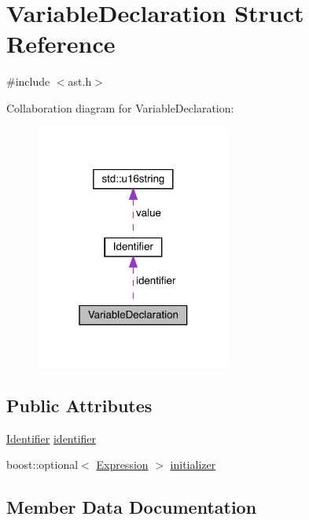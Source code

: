 \hypertarget{struct_variable_declaration}{}\section{Variable\+Declaration Struct Reference}
\label{struct_variable_declaration}


{\ttfamily \#include $<$ast.\+h$>$}



Collaboration diagram for Variable\+Declaration\+:\nopagebreak
\begin{figure}[H]
\begin{center}
\leavevmode
\includegraphics[width=183pt]{struct_variable_declaration__coll__graph}
\end{center}
\end{figure}
\subsection*{Public Attributes}
\begin{DoxyCompactItemize}
\item 
\hyperlink{struct_identifier}{Identifier} \hyperlink{struct_variable_declaration_ac2becfe85c6ae641ab60e8489fde7e38}{identifier}
\item 
boost\+::optional$<$ \hyperlink{ast_8h_a4cb273a4d960cd13ea17d08f254493e8}{Expression} $>$ \hyperlink{struct_variable_declaration_a8e4857906d3af342fa2fb5675ff9a410}{initializer}
\end{DoxyCompactItemize}


\subsection{Member Data Documentation}
\mbox{\label{struct_variable_declaration_ac2becfe85c6ae641ab60e8489fde7e38}} 
